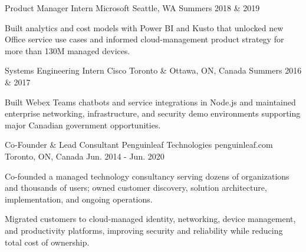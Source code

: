 \begin{cventries}
  \cventry
    {Product Manager Intern} %
    {Microsoft} %
    {} %
    {Seattle, WA} %
    {Summers 2018 \& 2019} %
    {
      \begin{cvitems} %
        \item {Built analytics and cost models with Power BI and Kusto that unlocked new Office service use cases and informed cloud-management product strategy for more than 130M managed devices.}
      \end{cvitems}
    }

  \cventry
    {Systems Engineering Intern} %
    {Cisco} %
    {} %
    {Toronto \& Ottawa, ON, Canada} %
    {Summers 2016 \& 2017} %
    {
      \begin{cvitems} %
        \item {Built Webex Teams chatbots and service integrations in Node.js and maintained enterprise networking, infrastructure, and security demo environments supporting major Canadian government opportunities.}
      \end{cvitems}
    }

  \cventry
    {Co-Founder \& Lead Consultant} %
    {Penguinleaf Technologies} %
    {penguinleaf.com} %
    {Toronto, ON, Canada} %
    {Jun. 2014 - Jun. 2020} %
    {
      \begin{cvitems} %
        \item {Co-founded a managed technology consultancy serving dozens of organizations and thousands of users; owned customer discovery, solution architecture, implementation, and ongoing operations.}
        \item {Migrated customers to cloud-managed identity, networking, device management, and productivity platforms, improving security and reliability while reducing total cost of ownership.}
      \end{cvitems}
    }

\end{cventries}
